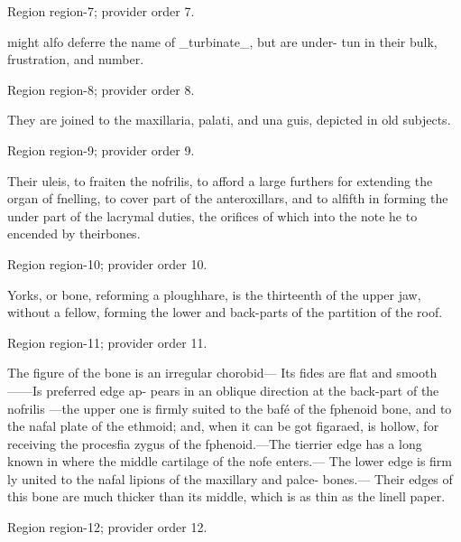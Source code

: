 \documentclass[11pt]{article}
\begin{document}
{\scriptsize\color{gray} Region region-7; provider order 7.\par}
\medskip

might alfo deferre the name of \_turbinate\_, but are under-
tun in their bulk, frustration, and number.
\par

{\scriptsize\color{gray} Region region-8; provider order 8.\par}
\medskip

They are joined to the maxillaria, palati, and una
guis, depicted in old subjects.
\par

{\scriptsize\color{gray} Region region-9; provider order 9.\par}
\medskip

Their uleis, to fraiten the nofrilis, to afford a large
furthers for extending the organ of fnelling, to cover
part of the anteroxillars, and to alfifth in forming the
under part of the lacrymal duties, the orifices of which
into the note he to encended by theirbones.
\par

{\scriptsize\color{gray} Region region-10; provider order 10.\par}
\medskip

Yorks, or bone, reforming a ploughhare, is the
thirteenth of the upper jaw, without a fellow, forming
the lower and back-parts of the partition of the roof.
\par

{\scriptsize\color{gray} Region region-11; provider order 11.\par}
\medskip

The figure of the bone is an irregular chorobid—
Its fides are flat and smooth——Is preferred edge ap-
pears in an oblique direction at the back-part of the nofrilis
—the upper one is firmly suited to the bafé of
the fphenoid bone, and to the nafal plate of the ethmoid; and, when it can be got figaraed, is hollow, for
receiving the procesfia zygus of the fphenoid.—The
tierrier edge has a long known in where the middle
cartilage of the nofe enters.— The lower edge is firm
ly united to the nafal lipions of the maxillary and palce-
bones.— Their edges of this bone are much thicker
than its middle, which is as thin as the linell paper.
\par

{\scriptsize\color{gray} Region region-12; provider order 12.\par}
\medskip
\end{document}
